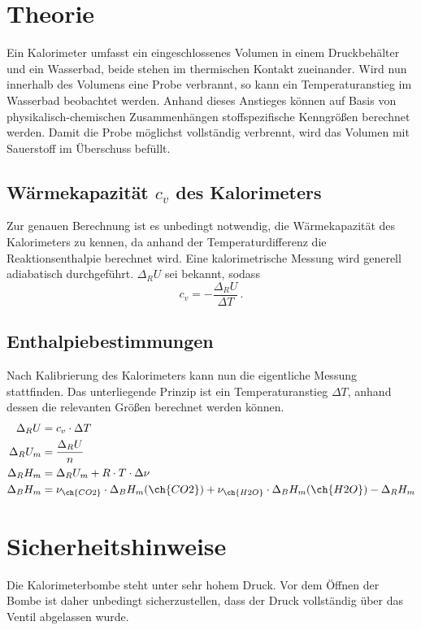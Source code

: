 \section{Theorie}
Ein Kalorimeter umfasst ein eingeschlossenes Volumen in einem Druckbehälter und ein Wasserbad, beide stehen im thermischen Kontakt zueinander.
Wird nun innerhalb des Volumens eine Probe verbrannt, so kann ein Temperaturanstieg im Wasserbad beobachtet werden.
Anhand dieses Anstieges können auf Basis von physikalisch-chemischen Zusammenhängen stoffspezifische Kenngrößen berechnet werden.
Damit die Probe möglichst vollständig verbrennt, wird das Volumen mit Sauerstoff im Überschuss befüllt.

\subsection{Wärmekapazität $c_v$ des Kalorimeters}
Zur genauen Berechnung ist es unbedingt notwendig, die Wärmekapazität des Kalorimeters zu kennen, da anhand der Temperaturdifferenz die Reaktionsenthalpie berechnet wird.
Eine kalorimetrische Messung wird generell adiabatisch durchgeführt.
$\Delta_R U$ sei bekannt, sodass
\begin{equation}
    c_v = - \frac{\Delta_R U}{\Delta T}\, \text{.} \label{eqn:heat-capacity}
\end{equation}

\subsection{Enthalpiebestimmungen}
Nach Kalibrierung des Kalorimeters kann nun die eigentliche Messung stattfinden.
Das unterliegende Prinzip ist ein Temperaturanstieg $\Delta T$, anhand dessen die relevanten Größen berechnet werden können.
\begin{align}
      \Delta_R U &= c_v \cdot \Delta T \label{eqn:verbrennungsenergie} \\
    \Delta_R U_m &= \frac{\Delta_R U}{n} \label{eqn:molare-verbrennungsenergie} \\
    \Delta_R H_m &= \Delta_R U_m + R \cdot T \cdot \Delta \nu \label{eqn:molare-verbrennungsenthalpie} \\
    \Delta_B H_m &= \nu_{\ch{CO2}} \cdot \Delta_B H_m (\ch{CO2}) + \nu_{\ch{H2O}} \cdot \Delta_B H_m (\ch{H2O}) - \Delta_R H_m \label{eqn:bildungsenthalpie}
\end{align}

\section{Sicherheitshinweise}
Die Kalorimeterbombe steht unter sehr hohem Druck.
Vor dem Öffnen der Bombe ist daher unbedingt sicherzustellen, dass der Druck vollständig über das Ventil abgelassen wurde.

